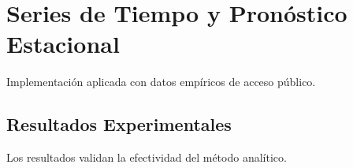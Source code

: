 \section{Series de Tiempo y Pronóstico Estacional}
Implementación aplicada con datos empíricos de acceso público.
\subsection{Resultados Experimentales}
Los resultados validan la efectividad del método analítico.

